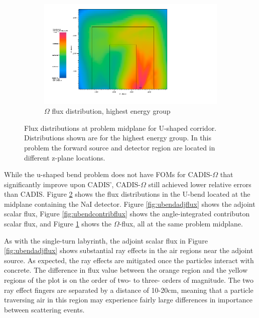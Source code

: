 \begin{figure}[htb!]\ContinuedFloat
  \centering
  \begin{subfigure}[t]{\textwidth}
    \includegraphics[width=0.9\linewidth]{./chapters/characterization_probs/figures/char/prob_2/prob2omegaG00.png}
    \caption{$\Omega$ flux distribution, highest energy group}
    \label{fig:ubendomegaflux}
  \end{subfigure}
  \caption[Flux distributions at problem midplane for U-shaped corridor.]{Flux
  distributions at problem midplane for U-shaped corridor. Distributions shown
are for the highest energy group. In this problem the forward source and
detector region are located in different z-plane locations.}
  \label{fig:ubendfluxes}
\end{figure}

While the u-shaped bend problem does not have FOMs for CADIS-$\Omega$ that
significantly improve upon CADIS', CADIS-$\Omega$ still achieved lower relative
errors than CADIS. Figure \ref{fig:ubendfluxes} shows the flux distributions in
the U-bend located at the midplane containing the NaI detector. Figure
\ref{fig:ubendadjflux} shows the adjoint scalar flux, Figure
\ref{fig:ubendcontribflux} shows the angle-integrated contributon scalar flux,
and Figure \ref{fig:ubendomegaflux} shows the $\Omega$-flux, all at the same
problem midplane.

As with the single-turn labyrinth, the adjoint scalar flux
in Figure \ref{fig:ubendadjflux} shows substantial ray effects
in the air regions near the adjoint source. As
expected, the ray effects are mitigated once the particles interact with
concrete. The difference in flux value between the orange region and the yellow
regions of the plot is on the order of two- to three- orders of magnitude. The
two ray effect fingers are separated by a distance of 10-20cm, meaning that a
particle traversing air in this region may experience fairly large differences
in importance between scattering events.

